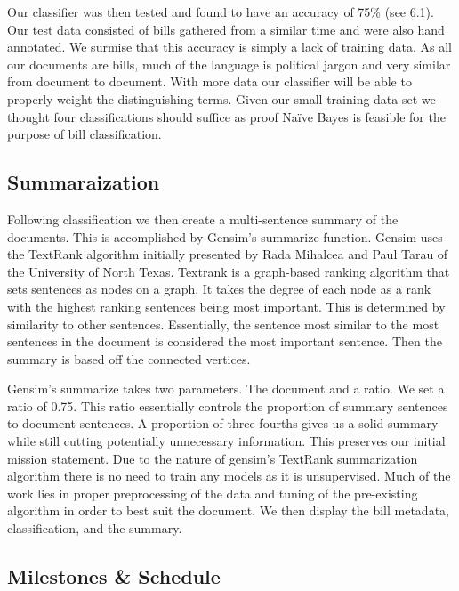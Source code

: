 \documentclass[11pt,a4paper]{article}
\begin{document}
Our classifier was then tested and found to have an accuracy of 75\% (see 6.1). Our test data consisted of bills gathered from a similar time and were also hand annotated. We surmise that this accuracy is simply a lack of training data. As all our documents are bills, much of the language is political jargon and very similar from document to document. With more data our classifier will be able to properly weight the distinguishing terms. Given our small training data set we thought four classifications should suffice as proof Naïve Bayes is feasible for the purpose of bill classification.

\subsection{Summaraization}
Following classification we then create a multi-sentence summary of the documents. This is accomplished by Gensim’s summarize function. Gensim uses the TextRank algorithm initially presented by Rada Mihalcea and Paul Tarau of the University of North Texas. Textrank is a graph-based ranking algorithm that sets sentences as nodes on a graph. It takes the degree of each node as a rank with the highest ranking sentences being most important. This is determined by similarity to other sentences. Essentially, the sentence most similar to the most sentences in the document is considered the most important sentence. Then the summary is based off the connected vertices. 

Gensim's summarize takes two parameters. The document and a ratio. We set a ratio of 0.75. This ratio essentially controls the proportion of summary sentences to document sentences. A proportion of three-fourths gives us a solid summary while still cutting potentially unnecessary information. This preserves our initial mission statement. Due to the nature of gensim’s TextRank summarization algorithm there is no need to train any models as it is unsupervised. Much of the work lies in proper preprocessing of the data and tuning of the pre-existing algorithm in order to best suit the document. We then display the bill metadata, classification, and the summary. 

\subsection{Milestones \& Schedule}
\end{document}
